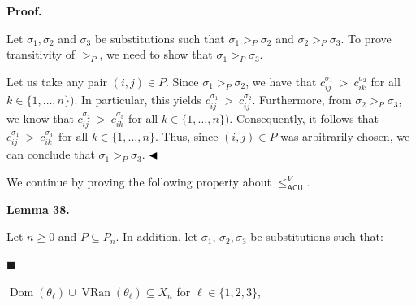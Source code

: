 \par\medskip\noindent\textbf{Proof.}\par
 
 
Let $\sigma_{1},\sigma_{2}$ and $\sigma_{3}$ be substitutions such that $\sigma_{1}>_{P}\sigma_{2}$ and $\sigma_{2}>_{P}\sigma_{3}$. To prove transitivity of $>_{P}$, we need to show that $\sigma_{1}>_{P}\sigma_{3}$.\par
 
 
 
Let us take any pair $(i,j)\in P$. Since $\sigma_{1}>_{P}\sigma_{2}$, we have that $c^{\sigma_{1}}_{ij}\ >\ c^{\sigma_{2}}_{ik}$ for all $k\in\{1,\ldots,n\})$. In particular, this yields $c^{\sigma_{1}}_{ij}\ >\ c^{\sigma_{2}}_{ij}$. Furthermore, from $\sigma_{2}>_{P}\sigma_{3}$, we know that $c^{\sigma_{2}}_{ij}\ >\ c^{\sigma_{3}}_{ik}$ for all $k\in\{1,\ldots,n\})$. Consequently, it follows that $c^{\sigma_{1}}_{ij}\ >\ c^{\sigma_{3}}_{ik}\ \ \mbox{for all }k\in\{1,\ldots,n\}.$ Thus, since $(i,j)\in P$ was arbitrarily chosen, we can conclude that $\sigma_{1}>_{P}\sigma_{3}$. $\hfill\blacktriangleleft$\par
 
 
 
We continue by proving the following property about $\leq_{\mathsf{ACU}}^{V}$.\par
 
 
 
\par\medskip\noindent\textbf{Lemma 38.}\par
 
 
Let $n\geq 0$ and $P\subseteq P_{n}$. In addition, let $\sigma_{1}$, $\sigma_{2},\sigma_{3}$ be substitutions such that:\par
  
\par\noindent  $\blacksquare$ 
 
$\operatorname{Dom}(\theta_{\ell})\cup\operatorname{VRan}(\theta_{\ell})%
\subseteq X_{n}$ for $\ell\in\{1,2,3\}$,\par
 
 
